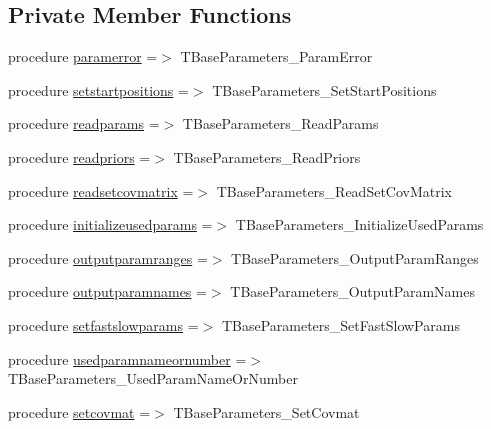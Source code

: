 \subsection*{Private Member Functions}
\begin{DoxyCompactItemize}
\item 
procedure \mbox{\hyperlink{structbaseparameters_1_1tbaseparameters_aca7a089b5e45454160bc5f3184ffc56a}{paramerror}} =$>$ T\+Base\+Parameters\+\_\+\+Param\+Error
\item 
procedure \mbox{\hyperlink{structbaseparameters_1_1tbaseparameters_a159171f4b3b907e3973de8e09ab9587a}{setstartpositions}} =$>$ T\+Base\+Parameters\+\_\+\+Set\+Start\+Positions
\item 
procedure \mbox{\hyperlink{structbaseparameters_1_1tbaseparameters_a6952b1390938299feddf6ccfcccd75ee}{readparams}} =$>$ T\+Base\+Parameters\+\_\+\+Read\+Params
\item 
procedure \mbox{\hyperlink{structbaseparameters_1_1tbaseparameters_af7c87f88a0da5f459e828c2f80c9851c}{readpriors}} =$>$ T\+Base\+Parameters\+\_\+\+Read\+Priors
\item 
procedure \mbox{\hyperlink{structbaseparameters_1_1tbaseparameters_a45828c232b83ddd1364da43032ac3c9c}{readsetcovmatrix}} =$>$ T\+Base\+Parameters\+\_\+\+Read\+Set\+Cov\+Matrix
\item 
procedure \mbox{\hyperlink{structbaseparameters_1_1tbaseparameters_a500c52b94b8ede52110e99c6e9209869}{initializeusedparams}} =$>$ T\+Base\+Parameters\+\_\+\+Initialize\+Used\+Params
\item 
procedure \mbox{\hyperlink{structbaseparameters_1_1tbaseparameters_acf5f801ce60d6160702b2fa10fc7ed92}{outputparamranges}} =$>$ T\+Base\+Parameters\+\_\+\+Output\+Param\+Ranges
\item 
procedure \mbox{\hyperlink{structbaseparameters_1_1tbaseparameters_a6895c7e5ac51f54cebab9ef86c1f2776}{outputparamnames}} =$>$ T\+Base\+Parameters\+\_\+\+Output\+Param\+Names
\item 
procedure \mbox{\hyperlink{structbaseparameters_1_1tbaseparameters_a8b0c782b4e709bc856ebaf55f56bca48}{setfastslowparams}} =$>$ T\+Base\+Parameters\+\_\+\+Set\+Fast\+Slow\+Params
\item 
procedure \mbox{\hyperlink{structbaseparameters_1_1tbaseparameters_af1c7ec23fd39d2ea7d9abb2a904fe6ad}{usedparamnameornumber}} =$>$ T\+Base\+Parameters\+\_\+\+Used\+Param\+Name\+Or\+Number
\item 
procedure \mbox{\hyperlink{structbaseparameters_1_1tbaseparameters_ad2e7517b618450734e1540863aea2667}{setcovmat}} =$>$ T\+Base\+Parameters\+\_\+\+Set\+Covmat
\end{DoxyCompactItemize}
